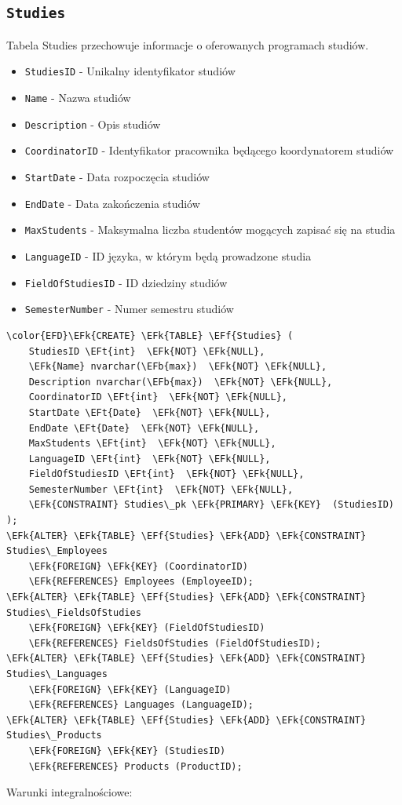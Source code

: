\documentclass[11pt]{article}
\newcommand{\EFk}[1]{\textcolor{EFk}{\textbf{#1}}} %
\newcommand{\EFb}[1]{\textcolor{EFb}{\textbf{#1}}} %
\newcommand{\EFf}[1]{\textcolor{EFf}{#1}} %
\newcommand{\EFt}[1]{\textcolor{EFt}{\textbf{#1}}} %
\begin{document}
\subsection{\texttt{Studies}}
\label{sec:org93024e2}
Tabela Studies przechowuje informacje o oferowanych programach studiów.
\begin{itemize}
\item \texttt{StudiesID} - Unikalny identyfikator studiów
\item \texttt{Name} - Nazwa studiów
\item \texttt{Description} - Opis studiów
\item \texttt{CoordinatorID} - Identyfikator pracownika będącego koordynatorem studiów
\item \texttt{StartDate} - Data rozpoczęcia studiów
\item \texttt{EndDate} - Data zakończenia studiów
\item \texttt{MaxStudents} - Maksymalna liczba studentów mogących zapisać się na studia
\item \texttt{LanguageID} - ID języka, w którym będą prowadzone studia
\item \texttt{FieldOfStudiesID} - ID dziedziny studiów
\item \texttt{SemesterNumber} - Numer semestru studiów
\end{itemize}
\begin{Code}
\begin{Verbatim}
\color{EFD}\EFk{CREATE} \EFk{TABLE} \EFf{Studies} (
    StudiesID \EFt{int}  \EFk{NOT} \EFk{NULL},
    \EFk{Name} nvarchar(\EFb{max})  \EFk{NOT} \EFk{NULL},
    Description nvarchar(\EFb{max})  \EFk{NOT} \EFk{NULL},
    CoordinatorID \EFt{int}  \EFk{NOT} \EFk{NULL},
    StartDate \EFt{Date}  \EFk{NOT} \EFk{NULL},
    EndDate \EFt{Date}  \EFk{NOT} \EFk{NULL},
    MaxStudents \EFt{int}  \EFk{NOT} \EFk{NULL},
    LanguageID \EFt{int}  \EFk{NOT} \EFk{NULL},
    FieldOfStudiesID \EFt{int}  \EFk{NOT} \EFk{NULL},
    SemesterNumber \EFt{int}  \EFk{NOT} \EFk{NULL},
    \EFk{CONSTRAINT} Studies\_pk \EFk{PRIMARY} \EFk{KEY}  (StudiesID)
);
\EFk{ALTER} \EFk{TABLE} \EFf{Studies} \EFk{ADD} \EFk{CONSTRAINT} Studies\_Employees
    \EFk{FOREIGN} \EFk{KEY} (CoordinatorID)
    \EFk{REFERENCES} Employees (EmployeeID);
\EFk{ALTER} \EFk{TABLE} \EFf{Studies} \EFk{ADD} \EFk{CONSTRAINT} Studies\_FieldsOfStudies
    \EFk{FOREIGN} \EFk{KEY} (FieldOfStudiesID)
    \EFk{REFERENCES} FieldsOfStudies (FieldOfStudiesID);
\EFk{ALTER} \EFk{TABLE} \EFf{Studies} \EFk{ADD} \EFk{CONSTRAINT} Studies\_Languages
    \EFk{FOREIGN} \EFk{KEY} (LanguageID)
    \EFk{REFERENCES} Languages (LanguageID);
\EFk{ALTER} \EFk{TABLE} \EFf{Studies} \EFk{ADD} \EFk{CONSTRAINT} Studies\_Products
    \EFk{FOREIGN} \EFk{KEY} (StudiesID)
    \EFk{REFERENCES} Products (ProductID);
\end{Verbatim}
\end{Code}
Warunki integralnościowe:
\end{document}
